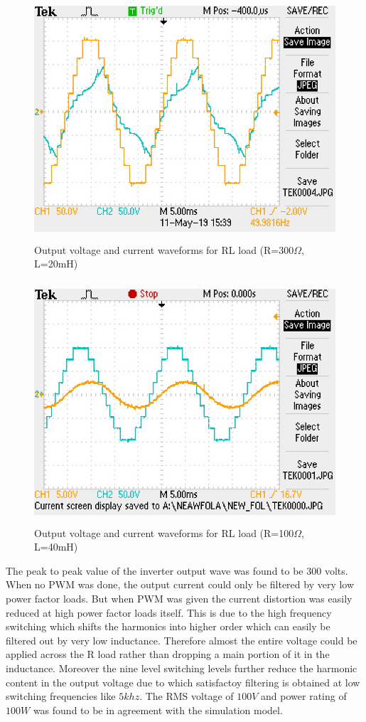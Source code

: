 \documentclass[12pt,a4paper]{report}
\begin{document}
\begin{figure}[H]
	\begin{center}
		\includegraphics[width=16cm,height=9cm]{figures/HPF.JPG}
	\end{center}
	\caption{Output voltage and current waveforms for RL load (R=300$\Omega$, L=20mH)}	
\end{figure}
\begin{figure}[H]
	\begin{center}
		\includegraphics[width=16cm,height=9cm]{figures/LPF.JPG}
	\end{center}
		\caption{Output voltage and current waveforms for RL load (R=100$\Omega$, L=40mH)}
	\end{figure}

The peak to peak value of the inverter output wave was found to be 300 volts. When no PWM was done, the output current could only be filtered by very low power factor loads. But when PWM was given the current distortion was easily reduced at high power factor loads itself. This is due to the high frequency switching which shifts the harmonics into higher order which can easily be filtered out by very low inductance. Therefore almost the entire voltage could be applied across the R load rather than dropping a main portion of it in the inductance.
Moreover the nine level switching levels further reduce the harmonic content in the output voltage due to which satisfactoy filtering is obtained at low switching frequencies like $5khz$. The RMS voltage of $100V$ and power rating of $100W$ was found to be in agreement with the simulation model.
\end{document}
